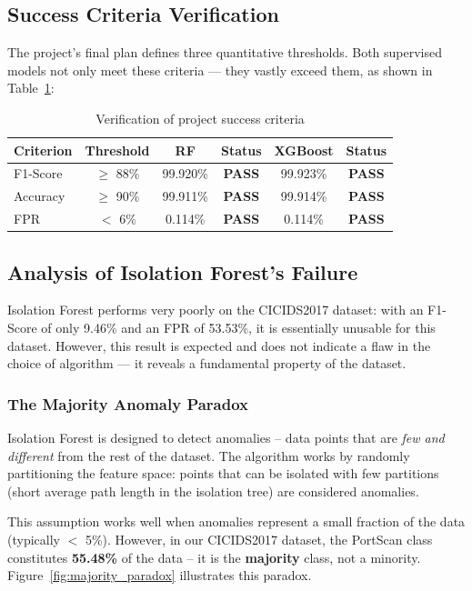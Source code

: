 \subsection{Success Criteria Verification}

The project's final plan defines three quantitative thresholds. Both supervised models not only meet these criteria --- they vastly exceed them, as shown in Table~\ref{tab:success}:

\begin{table}[H]
\centering
\caption{Verification of project success criteria}
\label{tab:success}
\begin{tabular}{lccccc}
\toprule
\textbf{Criterion} & \textbf{Threshold} & \textbf{RF} & \textbf{Status} & \textbf{XGBoost} & \textbf{Status} \\
\midrule
F1-Score & $\geq$ 88\% & 99.920\% & \textbf{PASS} & 99.923\% & \textbf{PASS} \\
Accuracy & $\geq$ 90\% & 99.911\% & \textbf{PASS} & 99.914\% & \textbf{PASS} \\
FPR & $<$ 6\% & 0.114\% & \textbf{PASS} & 0.114\% & \textbf{PASS} \\
\bottomrule
\end{tabular}
\end{table}

\subsection{Analysis of Isolation Forest's Failure}

Isolation Forest performs very poorly on the CICIDS2017 dataset: with an F1-Score of only 9.46\% and an FPR of 53.53\%, it is essentially unusable for this dataset. However, this result is expected and does not indicate a flaw in the choice of algorithm --- it reveals a fundamental property of the dataset.

\subsubsection{The Majority Anomaly Paradox}

Isolation Forest is designed to detect anomalies -- data points that are \textit{few and different} from the rest of the dataset. The algorithm works by randomly partitioning the feature space: points that can be isolated with few partitions (short average path length in the isolation tree) are considered anomalies.

This assumption works well when anomalies represent a small fraction of the data (typically $<$ 5\%). However, in our CICIDS2017 dataset, the PortScan class constitutes \textbf{55.48\%} of the data -- it is the \textbf{majority} class, not a minority. Figure~\ref{fig:majority_paradox} illustrates this paradox.


